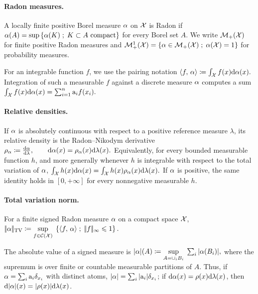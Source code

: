 \paragraph{Radon measures.}
\begin{defn}\label{def-radon-probability-measures}
A locally finite positive Borel measure $\alpha$ on $\mathcal{X}$ is Radon if
\(\alpha(A)=\sup\left\{ \alpha(K) \;;\; K\subset A\text{ compact} \right\}\)
for every Borel set $A$. We write $\mathcal{M}_+(\mathcal{X})$ for finite positive Radon measures and
$\mathcal{M}_+^1(\mathcal{X})=\left\{ \alpha\in\mathcal{M}_+(\mathcal{X}) \;;\; \alpha(\mathcal{X})=1 \right\}$ for probability measures.
\end{defn}
For an integrable function $f$, we use the pairing notation
\(\langle f,\,\alpha\rangle\coloneqq\int_{\mathcal{X}} f(x)\mathrm{d}\alpha(x).\)
Integration of such a measurable $f$ against a discrete measure $\alpha$ computes a sum
\(\int_{\mathcal{X}} f(x) \mathrm{d}\alpha(x) = \sum_{i=1}^n \mathrm{a}_i f(x_i).\)
\paragraph{Relative densities.}
\begin{defn}\label{def-relative-density}
If $\alpha$ is absolutely continuous with respect to a positive reference measure $\lambda$, its relative density is the Radon--Nikodym derivative
\(\rho_{\alpha}\coloneqq\frac{\mathrm{d}\alpha}{\mathrm{d}\lambda}, \qquad \mathrm{d}\alpha(x)=\rho_{\alpha}(x)\mathrm{d}\lambda(x).\)
Equivalently, for every bounded measurable function $h$, and more generally whenever $h$ is integrable with respect to the total variation of $\alpha$, \(\int_{\mathcal{X}} h(x) \mathrm{d}\alpha(x) = \int_{\mathcal{X}} h(x) \rho_{\alpha}(x) \mathrm{d}\lambda(x).\)
If $\alpha$ is positive, the same identity holds in $[0,+\infty]$ for every nonnegative measurable $h$.
\end{defn}
\paragraph{Total variation norm.}
\begin{defn}\label{defn-total-variation}
For a finite signed Radon measure $\alpha$ on a compact space $\mathcal{X}$, \(|\!| \alpha |\!|_{\operatorname{TV}} \coloneqq \underset{f \in \mathcal{C}(\mathcal{X})}{\sup}\; \left\{ \langle f,\,\alpha\rangle \;;\; |\!| f |\!|_\infty \leqslant 1 \right\}.\)
\end{defn}
The absolute value of a signed measure is \(|\alpha|(A) \coloneqq \underset{A=\cup_i B_i}{\sup}\; \sum_i |\alpha(B_i)|,\)
where the supremum is over finite or countable measurable partitions of $A$. Thus, if $\alpha=\sum_i \mathrm{a}_i \delta_{x_i}$ with distinct atoms, $|\alpha|=\sum_i |\mathrm{a}_i|\delta_{x_i}$; if $\mathrm{d}\alpha(x)=\rho(x)\mathrm{d}\lambda(x)$, then $\mathrm{d}|\alpha|(x)=|\rho(x)|\mathrm{d}\lambda(x)$.

